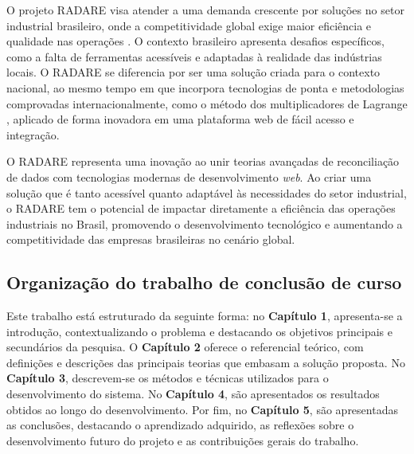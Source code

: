 O projeto RADARE visa atender a uma demanda crescente por soluções no setor industrial brasileiro, onde a competitividade global exige maior eficiência e qualidade nas operações \cite{govbr}. O contexto brasileiro apresenta desafios específicos, como a falta de ferramentas acessíveis e adaptadas à realidade das indústrias locais. O RADARE se diferencia por ser uma solução criada para o contexto nacional, ao mesmo tempo em que incorpora tecnologias de ponta e metodologias comprovadas internacionalmente, como o método dos multiplicadores de Lagrange \cite{lagrangebio}, aplicado de forma inovadora em uma plataforma web de fácil acesso e integração.

O RADARE representa uma inovação ao unir teorias avançadas de reconciliação de dados com tecnologias modernas de desenvolvimento \textit{web}. Ao criar uma solução que é tanto acessível quanto adaptável às necessidades do setor industrial, o RADARE tem o potencial de impactar diretamente a eficiência das operações industriais no Brasil, promovendo o desenvolvimento tecnológico e aumentando a competitividade das empresas brasileiras no cenário global.

\subsection{Organização do trabalho de conclusão de curso}

Este trabalho está estruturado da seguinte forma: no \textbf{Capítulo 1}, apresenta-se a introdução, contextualizando o problema e destacando os objetivos principais e secundários da pesquisa. O \textbf{Capítulo 2} oferece o referencial teórico, com definições e descrições das principais teorias que embasam a solução proposta. No \textbf{Capítulo 3}, descrevem-se os métodos e técnicas utilizados para o desenvolvimento do sistema. No \textbf{Capítulo 4}, são apresentados os resultados obtidos ao longo do desenvolvimento. Por fim, no \textbf{Capítulo 5}, são apresentadas as conclusões, destacando o aprendizado adquirido, as reflexões sobre o desenvolvimento futuro do projeto e as contribuições gerais do trabalho.
